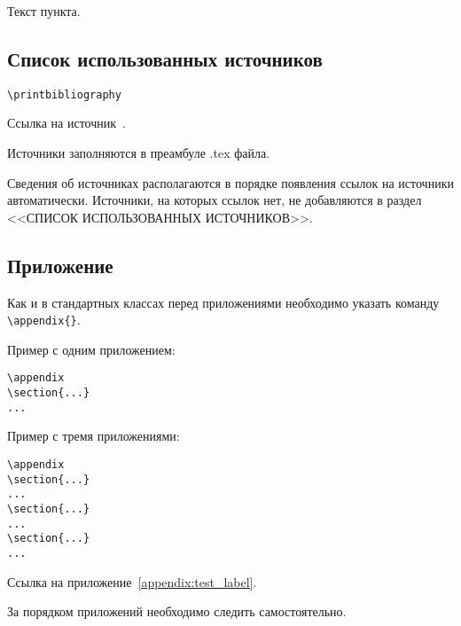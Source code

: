 \documentclass[14pt, a4paper, titlepage]{extarticle}
\renewcommand{\thesection}{\Asbuk{section}}
\let\oldsec\section
\renewcommand{\section}{
        \clearpage
        \phantomsection
        \refstepcounter{section}
        \addcontentsline{toc}{section}{\appendixname~\thesection}
        \oldsec*} %
\let\oldprintbibliography\printbibliography
\renewcommand{\printbibliography}{\oldprintbibliography[title={Список использованных источников}]}
\begin{document}
Текст пункта.

\subsection{Список использованных источников}

\begin{verbatim}
\printbibliography
\end{verbatim}

Ссылка на источник~\cite{bib:recomendations}.

Источники заполняются в преамбуле .tex файла.

Сведения об источниках располагаются в порядке появления ссылок на источники автоматически. Источники, на которых ссылок нет, не добавляются в раздел <<СПИСОК ИСПОЛЬЗОВАННЫХ ИСТОЧНИКОВ>>.

\subsection{Приложение}

Как и в стандартных классах перед приложениями необходимо указать команду \verb"\appendix{}".

Пример с одним приложением:

\begin{verbatim}
\appendix
\section{...}
...
\end{verbatim}

Пример с тремя приложениями:

\begin{verbatim}
\appendix
\section{...}
...
\section{...}
...
\section{...}
...
\end{verbatim}

Ссылка на приложение~\ref{appendix:test_label}.

За порядком приложений необходимо следить самостоятельно.
\end{document}
